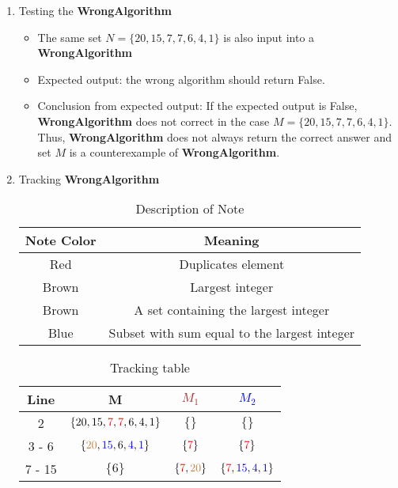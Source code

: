 \documentclass{article}
\begin{document}
	\begin{enumerate}
		\item Testing the \textbf{WrongAlgorithm}
		\begin{itemize}
			\item The same set \(N = \{20, 15, 7, 7, 6, 4, 1\}\) is also input into a \textbf{WrongAlgorithm}
			\item Expected output: the wrong algorithm should return False.
			\item Conclusion from expected output: If the expected output is False, \textbf{WrongAlgorithm} does not correct in the case \(M = \{20, 15, 7, 7, 6, 4, 1\}\). Thus, \textbf{WrongAlgorithm} does not always return the correct answer and set \(M\) is a counterexample of \textbf{WrongAlgorithm}.
		\end{itemize}
		\item Tracking \textbf{WrongAlgorithm}
		\begin{table}[ht]
			\centering
			\caption{Description of Note}
			\label{note}
			\begin{tabular}{|c|c|}
			\hline
			\textbf{Note Color} & \textbf{Meaning} \\
			\hline
			\textcolor{dupcolor}{Red} & Duplicates element \\
			\hline
			\textcolor{maxintcolor}{Brown} & Largest integer \\
			\hline
			\textcolor{maxintcolor}{Brown} & A set containing the largest integer \\
			\hline
			\textcolor{subsetsumcolor}{Blue} & Subset with sum equal to the largest integer \\
			\hline
			\end{tabular}
			\end{table}
		\begin{table}[ht]
			\centering
			\caption{Tracking table}
			\label{tracking table}
			\begin{tabular}{|c|c|c|c|}
			\hline
			\rowcolor[HTML]{EFEFEF} 
			Line & \textbf{M} & \textbf{\textcolor{brown}{\(M_1\)}} & \textbf{\textcolor{blue}{\(M_2\)}} \\ \hline
			2 & \( \{20, 15, \textcolor{red}{7}, \textcolor{red}{7}, 6, 4, 1\} \) & \( \{\} \) & \( \{\} \) \\ \hline
			3 - 6 & \( \{\textcolor{brown}{20}, \textcolor{blue}{15}, 6, \textcolor{blue}{4}, \textcolor{blue}{1}\} \) & \( \{\textcolor{red}{7}\} \) & \( \{\textcolor{red}{7}\} \) \\ \hline
			7 - 15 & \( \{6\} \) & \( \{\textcolor{red}{7}, \textcolor{brown}{20}\} \) & \( \{\textcolor{red}{7},\textcolor{blue}{15} ,\textcolor{blue}{4}, \textcolor{blue}{1}\} \) \\ \hline

\end{tabular}
\end{table}
\end{enumerate}
\end{document}
